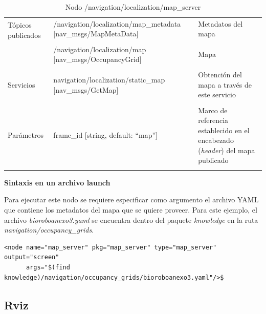 \documentclass[user_manual.tex]{subfiles}
\begin{document}
\begin{table}[H]
\begin{center}
\begin{tabular}{|l|p{7cm}|p{5cm}|}%
\hline

\multirow{2}{*}{Tópicos publicados}
& /navigation/localization/map\_metadata [nav\_msgs/MapMetaData] & Metadatos del mapa \\
& & \\
& /navigation/localization/map [nav\_msgs/OccupancyGrid] & Mapa  \\
& & \\
\cline{1-3}
 
Servicios
& navigation/localization/static\_map [nav\_msgs/GetMap] & Obtención del mapa a través de este servicio \\
& & \\
\hline

Parámetros
& frame\_id [string, default: ``map''] & Marco de referencia establecido en el encabezado (\textit{header}) del mapa publicado \\
& & \\
\hline

\end{tabular}
\caption{Nodo /navigation/localization/map\_server}
\label{map server node}
\end{center}
\end{table}

\textbf{Sintaxis en un archivo launch}

Para ejecutar este nodo se requiere especificar como argumento el archivo YAML que contiene los metadatos del mapa que se quiere proveer. Para este ejemplo, el archivo \textit{bioroboanexo3.yaml} se encuentra dentro del paquete \textit{knowledge} en la ruta \textit{navigation/occupancy\_grids}.\\
\begin{verbatim}
<node name="map_server" pkg="map_server" type="map_server" output="screen" 
      args="$(find knowledge)/navigation/occupancy_grids/bioroboanexo3.yaml"/>$
\end{verbatim}

\subsection{Rviz}
\end{document}
